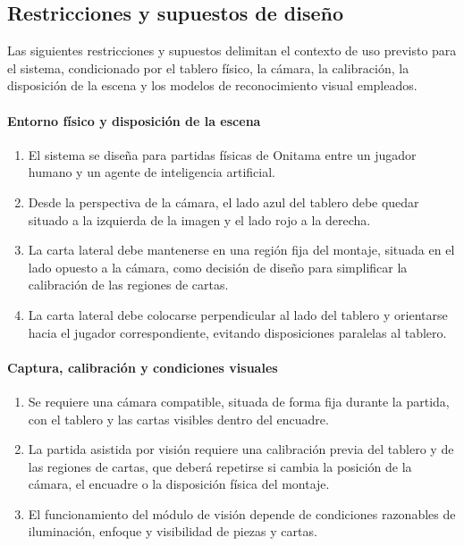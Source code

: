 \subsection{Restricciones y supuestos de diseño}

Las siguientes restricciones y supuestos delimitan el contexto de uso previsto para el sistema, condicionado por el tablero físico, la cámara, la calibración, la disposición de la escena y los modelos de reconocimiento visual empleados.

\paragraph{Entorno físico y disposición de la escena}

\begin{enumerate}[label=\textbf{RS-\twodigits*:}, leftmargin=2.2cm]
    \item El sistema se diseña para partidas físicas de Onitama entre un jugador humano y un agente de inteligencia artificial.

    \item Desde la perspectiva de la cámara, el lado azul del tablero debe quedar situado a la izquierda de la imagen y el lado rojo a la derecha.

    \item La carta lateral debe mantenerse en una región fija del montaje, situada en el lado opuesto a la cámara, como decisión de diseño para simplificar la calibración de las regiones de cartas.

    \item La carta lateral debe colocarse perpendicular al lado del tablero y orientarse hacia el jugador correspondiente, evitando disposiciones paralelas al tablero.
\end{enumerate}

\paragraph{Captura, calibración y condiciones visuales}

\begin{enumerate}[label=\textbf{RS-\twodigits*:}, leftmargin=2.2cm, resume]
    \item Se requiere una cámara compatible, situada de forma fija durante la partida, con el tablero y las cartas visibles dentro del encuadre.

    \item La partida asistida por visión requiere una calibración previa del tablero y de las regiones de cartas, que deberá repetirse si cambia la posición de la cámara, el encuadre o la disposición física del montaje.

    \item El funcionamiento del módulo de visión depende de condiciones razonables de iluminación, enfoque y visibilidad de piezas y cartas.
\end{enumerate}

